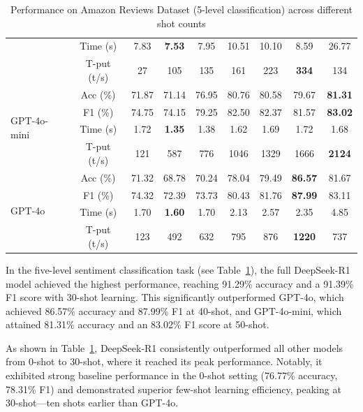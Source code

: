 \documentclass{IEEEcsmag}
\begin{document}
\begin{table}
{\begin{tabular}{lcccccccc}
 & Time (s) & 7.83 & \textbf{7.53} & 7.95 & 10.51 & 10.10 & 8.59 & 26.77 \\
 & T-put (t/s) & 27 & 105 & 135 & 161 & 223 & \textbf{334} & 134 \\
\midrule
\multirow{4}{*}{GPT-4o-mini} 
 & Acc (\%) & 71.87 & 71.14 & 76.95 & 80.76 & 80.58 & 79.67 & \textbf{81.31} \\
 & F1 (\%) & 74.75 & 74.15 & 79.25 & 82.50 & 82.37 & 81.57 & \textbf{83.02} \\
 & Time (s) & 1.72 & \textbf{1.35} & 1.38 & 1.62 & 1.69 & 1.72 & 1.68 \\
 & T-put (t/s) & 121 & 587 & 776 & 1046 & 1329 & 1666 & \textbf{2124} \\
\midrule
\multirow{4}{*}{GPT-4o} 
 & Acc (\%) & 71.32 & 68.78 & 70.24 & 78.04 & 79.49 & \textbf{86.57} & 81.67 \\
 & F1 (\%) & 74.32 & 72.39 & 73.73 & 80.43 & 81.76 & \textbf{87.99} & 83.11 \\
 & Time (s) & 1.70 & \textbf{1.60} & 1.70 & 2.13 & 2.57 & 2.35 & 4.85 \\
 & T-put (t/s) & 123 & 492 & 632 & 795 & 876 & \textbf{1220} & 737 \\
\bottomrule
\end{tabular}
}
\caption{Performance on Amazon Reviews Dataset (5-level classification) across different shot counts}
\label{tab:amazon}
\end{table}

In the five-level sentiment classification task (see Table~\ref{tab:amazon}), the full DeepSeek-R1 model achieved the highest performance, reaching 91.29\% accuracy and a 91.39\% F1 score with 30-shot learning. This significantly outperformed GPT-4o, which achieved 86.57\% accuracy and 87.99\% F1 at 40-shot, and GPT-4o-mini, which attained 81.31\% accuracy and an 83.02\% F1 score at 50-shot.

As shown in Table~\ref{tab:amazon}, DeepSeek-R1 consistently outperformed all other models from 0-shot to 30-shot, where it reached its peak performance. Notably, it exhibited strong baseline performance in the 0-shot setting (76.77\% accuracy, 78.31\% F1) and demonstrated superior few-shot learning efficiency, peaking at 30-shot—ten shots earlier than GPT-4o.
\end{document}
